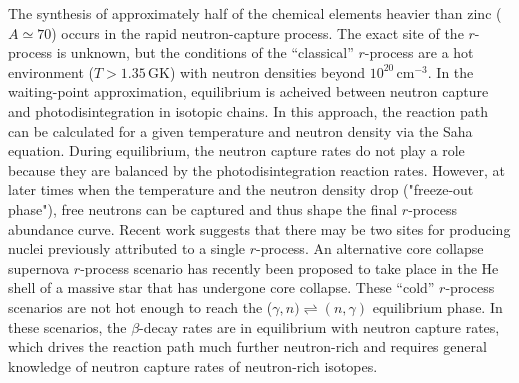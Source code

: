 {The synthesis of approximately half of the chemical elements heavier than zinc ($A \simeq 70$) occurs in the rapid neutron-capture process.
The exact site of the $r$-process is unknown, but the conditions of 
the ``classical'' $r$-process %
are a hot environment ($T> 1.35$\,GK) with neutron densities beyond %
$10^{20}$\,cm$^{-3}$. %
 In the waiting-point approximation, equilibrium is acheived between neutron capture and photodisintegration %
 in isotopic chains. %
In this approach, the reaction path can be  calculated for a given temperature and neutron density via the Saha equation. During equilibrium, the neutron capture rates do not play a role %
because they are balanced by the photodisintegration reaction rates. 
However, at later %
 times when 
the temperature and the neutron density drop ("freeze-out phase"), free neutrons %
can be captured and thus shape the final $r$-process abundance curve.
Recent work suggests that there may be two sites for producing nuclei previously attributed to a single $r$-process.
 An alternative core collapse supernova $r$-process scenario has recently been proposed %
to take place in the He shell of a massive star that has undergone core collapse. 
These %
 ``cold'' $r$-process scenarios
 are not hot enough to %
 reach the ($\gamma,n)\rightleftharpoons(n,\gamma)$ equilibrium phase. In these scenarios, the $\beta$-decay rates are in equilibrium with neutron capture rates, which drives the reaction path much further neutron-rich and requires general knowledge of neutron capture rates of neutron-rich isotopes.

}
